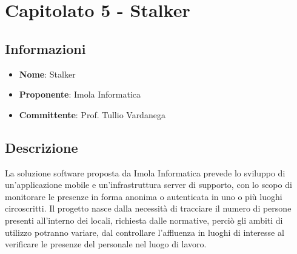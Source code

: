 \section{Capitolato 5 - Stalker}

\subsection{Informazioni}
\begin{itemize}
	\item \textbf{Nome}: Stalker
	\item \textbf{Proponente}: Imola Informatica
	\item \textbf{Committente}: Prof. Tullio Vardanega
\end{itemize}

\subsection{Descrizione}
La soluzione software proposta da Imola Informatica prevede lo sviluppo di un'applicazione mobile e un'infrastruttura server di supporto, con lo scopo di monitorare le presenze in forma anonima o autenticata in uno o più luoghi circoscritti.
Il progetto nasce dalla necessità di tracciare il numero di persone presenti all'interno dei locali, richiesta dalle normative, perciò gli ambiti di utilizzo potranno variare, dal controllare l'affluenza in luoghi di interesse al verificare le presenze del personale nel luogo di lavoro.

